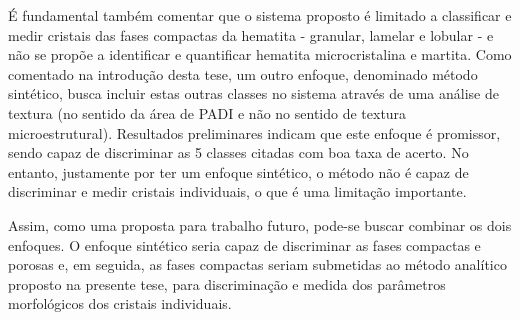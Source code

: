 É fundamental também comentar que o sistema proposto é limitado a
classificar e medir cristais das fases compactas da hematita - granular,
lamelar e lobular - e não se propõe a identificar e quantificar hematita
microcristalina e martita. Como comentado na introdução desta tese, um
outro enfoque, denominado método sintético, busca incluir estas outras
classes no sistema através de uma análise de textura (no sentido da área
de PADI e não no sentido de textura microestrutural). Resultados
preliminares indicam que este enfoque é promissor, sendo capaz de
discriminar as 5 classes citadas com boa taxa de acerto. No entanto,
justamente por ter um enfoque sintético, o método não é capaz de
discriminar e medir cristais individuais, o que é uma limitação
importante.

Assim, como uma proposta para trabalho futuro, pode-se buscar combinar
os dois enfoques. O enfoque sintético seria capaz de discriminar as
fases compactas e porosas e, em seguida, as fases compactas seriam
submetidas ao método analítico proposto na presente tese, para
discriminação e medida dos parâmetros morfológicos dos cristais
individuais.
